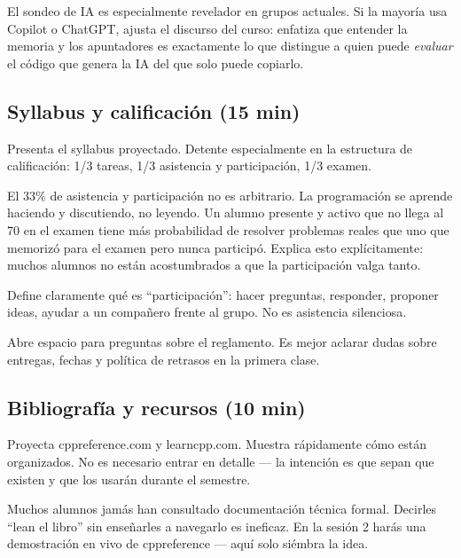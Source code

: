 \documentclass[12pt, oneside]{article}
\begin{document}
\begin{notaprofesor}
  El sondeo de IA es especialmente revelador en grupos actuales. Si la
  mayoría usa Copilot o ChatGPT, ajusta el discurso del curso: enfatiza
  que entender la memoria y los apuntadores es exactamente lo que distingue
  a quien puede \textit{evaluar} el código que genera la IA del que solo
  puede copiarlo.
\end{notaprofesor}

\subsection{Syllabus y calificación (15 min)}

Presenta el syllabus proyectado. Detente especialmente en la estructura de
calificación: 1/3 tareas, 1/3 asistencia y participación, 1/3 examen.

\begin{notaprofesor}
  El 33\% de asistencia y participación no es arbitrario. La programación
  se aprende haciendo y discutiendo, no leyendo. Un alumno presente y activo
  que no llega al 70 en el examen tiene más probabilidad de resolver problemas
  reales que uno que memorizó para el examen pero nunca participó. Explica
  esto explícitamente: muchos alumnos no están acostumbrados a que la
  participación valga tanto.

  \vspace{0.5em}
  Define claramente qué es ``participación'': hacer preguntas, responder,
  proponer ideas, ayudar a un compañero frente al grupo. No es asistencia
  silenciosa.
\end{notaprofesor}

Abre espacio para preguntas sobre el reglamento. Es mejor aclarar dudas
sobre entregas, fechas y política de retrasos en la primera clase.

\subsection{Bibliografía y recursos (10 min)}

Proyecta cppreference.com y learncpp.com. Muestra rápidamente cómo están
organizados. No es necesario entrar en detalle — la intención es que sepan
que existen y que los usarán durante el semestre.

\begin{notaprofesor}
  Muchos alumnos jamás han consultado documentación técnica formal. Decirles
  ``lean el libro'' sin enseñarles a navegarlo es ineficaz. En la sesión 2
  harás una demostración en vivo de cppreference — aquí solo siémbra la idea.
\end{notaprofesor}
\end{document}
